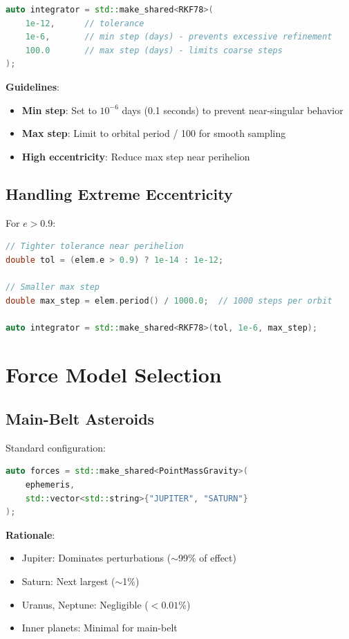 \begin{lstlisting}[language=C++]
auto integrator = std::make_shared<RKF78>(
    1e-12,      // tolerance
    1e-6,       // min step (days) - prevents excessive refinement
    100.0       // max step (days) - limits coarse steps
);
\end{lstlisting}

\textbf{Guidelines}:
\begin{itemize}
    \item \textbf{Min step}: Set to $10^{-6}$ days (0.1 seconds) to prevent near-singular behavior
    \item \textbf{Max step}: Limit to orbital period / 100 for smooth sampling
    \item \textbf{High eccentricity}: Reduce max step near perihelion
\end{itemize}

\subsection{Handling Extreme Eccentricity}

For $e > 0.9$:

\begin{lstlisting}[language=C++]
// Tighter tolerance near perihelion
double tol = (elem.e > 0.9) ? 1e-14 : 1e-12;

// Smaller max step
double max_step = elem.period() / 1000.0;  // 1000 steps per orbit

auto integrator = std::make_shared<RKF78>(tol, 1e-6, max_step);
\end{lstlisting}

\section{Force Model Selection}

\subsection{Main-Belt Asteroids}

Standard configuration:

\begin{lstlisting}[language=C++]
auto forces = std::make_shared<PointMassGravity>(
    ephemeris, 
    std::vector<std::string>{"JUPITER", "SATURN"}
);
\end{lstlisting}

\textbf{Rationale}:
\begin{itemize}
    \item Jupiter: Dominates perturbations ($\sim$99\% of effect)
    \item Saturn: Next largest ($\sim$1\%)
    \item Uranus, Neptune: Negligible ($< 0.01\%$)
    \item Inner planets: Minimal for main-belt
\end{itemize}

